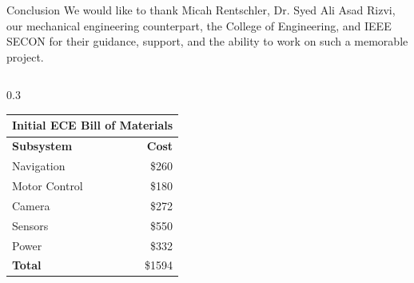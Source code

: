 \documentclass[final]{beamer}
\newlength{\colwidth}
\begin{document}
\begin{frame}[t]
\begin{columns}[t]
\begin{column}{\colwidth}
\begin{block}{Conclusion}
    We would like to thank Micah Rentschler, Dr. Syed Ali Asad Rizvi, our mechanical engineering counterpart, the College of Engineering, and IEEE SECON for their guidance, support, and the ability to work on such a memorable project.


  \begin{columns}[t]
  
    \begin{column}{0.3\colwidth}
      \begin{table}[ht]
        \begin{center}
          \label{tab:table1}
          \begin{tabular}{l|r} %
            \toprule
            \multicolumn{2}{c}{\textbf{Initial ECE Bill of Materials}} \\
            \midrule
            \cellcolor{white}\textbf{Subsystem} & \cellcolor{white}\textbf{Cost} \\
            \midrule
            Navigation & \$260 \\
            Motor Control & \$180 \\
            Camera & \$272 \\
            Sensors & \$550 \\
            Power & \$332 \\
            \cellcolor{white}\textbf{Total} & \cellcolor{white}\$1594 \\
            \bottomrule
          \end{tabular}
        \end{center}
      \end{table}    
    \end{column}


\end{columns}
\end{block}
\end{column}
\end{columns}
\end{frame}
\end{document}
